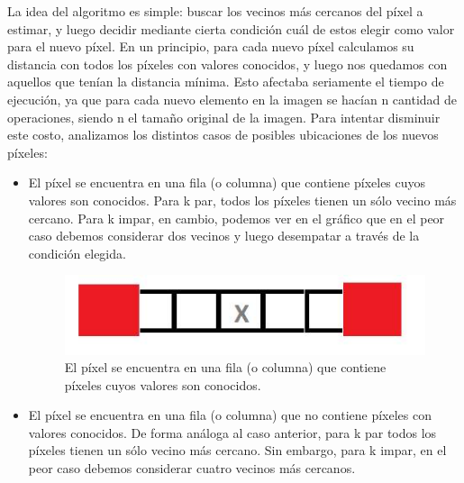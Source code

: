 \documentclass{article}
\begin{document}
La idea del algoritmo es simple: buscar los vecinos más cercanos del píxel a estimar, y luego decidir mediante cierta condición cuál de estos elegir como valor para el nuevo píxel. En un principio, para cada nuevo píxel calculamos su distancia con todos los píxeles con valores conocidos, y luego nos quedamos con aquellos que tenían la distancia mínima. Esto afectaba seriamente el tiempo de ejecución, ya que para cada nuevo elemento en la imagen se hacían n cantidad de operaciones, siendo n el tamaño original de la imagen. Para intentar disminuir este costo, analizamos los distintos casos de posibles ubicaciones de los nuevos píxeles:
\begin{itemize}

\item El píxel se encuentra en una fila (o columna) que contiene píxeles cuyos valores son conocidos. Para k par, todos los píxeles tienen un sólo vecino más cercano. Para k impar, en cambio, podemos ver en el gráfico que en el peor caso debemos considerar dos vecinos y luego desempatar a través de la condición elegida.

\begin{figure}[H]
\begin{center}
  \includegraphics[scale=0.25]{vecinos1}
  \caption{El píxel se encuentra en una fila (o columna) que contiene píxeles cuyos valores son conocidos.}\label{fig:vecinos1}
\end{center}
\end{figure}


\item El píxel se encuentra en una fila (o columna) que no contiene píxeles con valores conocidos. De forma análoga al caso anterior, para k par todos los píxeles tienen un sólo vecino más cercano. Sin embargo, para k impar, en el peor caso debemos considerar cuatro vecinos más cercanos.


\end{itemize}
\end{document}
